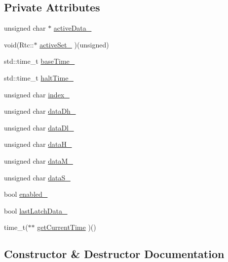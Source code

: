 \subsection*{Private Attributes}
\begin{DoxyCompactItemize}
\item 
unsigned char $\ast$ \hyperlink{classgambatte_1_1Rtc_a530d1274a2b8fcdbf706dc07854367eb}{active\+Data\+\_\+}
\item 
void(Rtc\+::$\ast$ \hyperlink{classgambatte_1_1Rtc_ae2993dd73fe23f156923337fff5097ce}{active\+Set\+\_\+} )(unsigned)
\item 
std\+::time\+\_\+t \hyperlink{classgambatte_1_1Rtc_a3281dc917dcdedd2097cc61fb8c3b509}{base\+Time\+\_\+}
\item 
std\+::time\+\_\+t \hyperlink{classgambatte_1_1Rtc_ac593f4655e2ae70a99951718f39d5c21}{halt\+Time\+\_\+}
\item 
unsigned char \hyperlink{classgambatte_1_1Rtc_af578e2d9c80922c5d75cc4f059331e35}{index\+\_\+}
\item 
unsigned char \hyperlink{classgambatte_1_1Rtc_afc1b7eb23f04d457468c4c417f084a1f}{data\+Dh\+\_\+}
\item 
unsigned char \hyperlink{classgambatte_1_1Rtc_ad0f8d812f4c73c2e234a0993e8e394a8}{data\+Dl\+\_\+}
\item 
unsigned char \hyperlink{classgambatte_1_1Rtc_a17d6c3ad34e81ce22dfbe4ab8f9d6765}{data\+H\+\_\+}
\item 
unsigned char \hyperlink{classgambatte_1_1Rtc_a3c97c47589a49a99e9a4b79209025c59}{data\+M\+\_\+}
\item 
unsigned char \hyperlink{classgambatte_1_1Rtc_aae9b98f609c66b68f063f71453bc1d34}{data\+S\+\_\+}
\item 
bool \hyperlink{classgambatte_1_1Rtc_a7d1f101afca4380423eec5bb61abc9e2}{enabled\+\_\+}
\item 
bool \hyperlink{classgambatte_1_1Rtc_a83aa7c62a3713978fdf3969f7cd60977}{last\+Latch\+Data\+\_\+}
\item 
time\+\_\+t($\ast$$\ast$ \hyperlink{classgambatte_1_1Rtc_a18030c75a27253b66c3c0c04eff43aa0}{get\+Current\+Time} )()
\end{DoxyCompactItemize}


\subsection{Constructor \& Destructor Documentation}
\mbox{\label{classgambatte_1_1Rtc_a973c37737e42cc8240ab6e72c5e54ad7}} 
